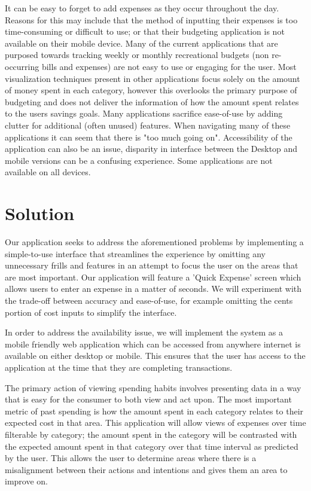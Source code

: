 \documentclass{chi2011}
\begin{document}
It can be easy to forget to add expenses as they occur throughout the day. Reasons for this may include that the method
of inputting their expenses is too time-consuming or difficult to use; or that their budgeting application is not
available on their mobile device. Many of the current applications that are purposed towards tracking weekly or monthly
recreational budgets (non re-occurring bills and expenses) are not easy to use or engaging for the user.  Most
visualization techniques present in other applications focus solely on the amount of money spent in each category,
however this overlooks the primary purpose of budgeting and does not deliver the information of how the amount spent
relates to the users savings goals. Many applications sacrifice ease-of-use by adding clutter for additional (often
unused) features. When navigating many of these applications it can seem that there is "too much going on".
Accessibility of the application can also be an issue, disparity in interface between the Desktop and mobile versions
can be a confusing experience. Some applications are not available on all devices.

\section{Solution}

Our application seeks to address the aforementioned problems by implementing a simple-to-use interface that streamlines
the experience by omitting any unnecessary frills and features in an attempt to focus the user on the areas that are
most important. Our application will feature a 'Quick Expense' screen which allows users to enter an expense in a
matter of seconds. We will experiment with the trade-off between accuracy and ease-of-use, for example omitting the
cents portion of cost inputs to simplify the interface.

In order to address the availability issue, we will implement the system as a mobile friendly web application which can
be accessed from anywhere internet is available on either desktop or mobile. This ensures that the user has access to
the application at the time that they are completing transactions.

The primary action of viewing spending habits involves presenting data in a way that is easy for the consumer to both
view and act upon. The most important metric of past spending is how the amount spent in each category relates to their
expected cost in that area. This application will allow views of expenses over time filterable by category; the amount
spent in the category will be contrasted with the expected amount spent in that category over that time interval as
predicted by the user. This allows the user to determine areas where there is a misalignment between their actions and
intentions and gives them an area to improve on.
\end{document}

